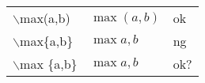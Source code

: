 \documentclass[preview]{standalone}
\newcommand{\tA}[1]{\textcolor{cA}{#1}}
\newcommand{\tC}[1]{\textcolor{cC}{#1}}
\newcommand{\tD}[1]{\textcolor{cD}{#1}}
\begin{document}
\begin{table}[h]
    \centering
    \begin{tabular}{lll}
        $\backslash$max(a,b)    & $\max(a,b)$  & \tA{ok}  \\
        $\backslash$max\{a,b\}  & $\max{a,b}$  & \tD{ng}  \\
        $\backslash$max \{a,b\} & $\max {a,b}$ & \tC{ok?}
    \end{tabular}
\end{table}
\end{document}
